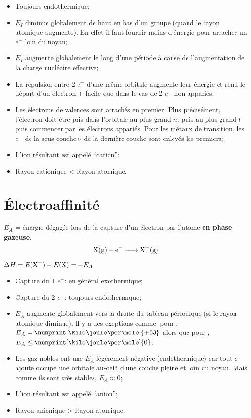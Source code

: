 \begin{itemize}
  \item Toujours endothermique;
  \item $E_I$ diminue globalement de haut en bas d'un groupe (quand le rayon atomique augmente).
    En effet il faut fournir moins d'énergie pour arracher un $e^-$ loin du noyau;
  \item $E_I$ augmente globalement le long d'une période à cause de l'augmentation de la charge nucléaire effective;
  \item La répulsion entre 2 $e^-$ d'une même orbitale augmente leur énergie et rend le départ d'un électron + facile que dans le cas de 2 $e^-$ non-appariés;
  \item Les électrons de valences sont arrachés en premier.
    Plus précisément,
    l'électron doit être pris dans l'orbitale au plus grand $n$,
    puis au plus grand $l$ puis commencer par les électrons appariés.
    Pour les métaux de transition,
    les $e^-$ de la sous-couche $\mathrm{s}$ de la dernière couche sont enlevés les premiers;
  \item L'ion résultant est appelé ``cation'';
  \item Rayon cationique < Rayon atomique.
\end{itemize}

\section{\'Electroaffinité}
\label{sec:electro}

$E_A$ = énergie dégagée lors de la capture d'un électron par l'atome \textbf{en phase gazeuse}.
\[ \ce{X(g) + e- -> X^-(g)} \]

$\Delta H = E(\ce{X^-})-E(\ce{X})=-E_A$

\begin{itemize}
  \item Capture du 1 $e^-$: en général exothermique;
  \item Capture du 2 $e^-$: toujours endothermique;
  \item $E_A$ augmente globalement vers la droite du tableau périodique (si le rayon atomique diminue).
    Il y a des exeptions comme:
    pour ,
    $E_A = \numprint[\kilo\joule\per\mole]{+53}$ alors que pour ,
    $E_A \leq \numprint[\kilo\joule\per\mole]{0}$;
  \item Les gaz nobles ont une $E_A$ légèrement négative (endothermique) car tout $e^-$ ajouté occupe une orbitale au-delà d'une couche pleine et loin du noyau.
    Mais comme ils sont très stables,
    $E_A \approx 0$;
  \item L'ion résultant est appelé ``anion'';
  \item Rayon anionique > Rayon atomique.
\end{itemize}


